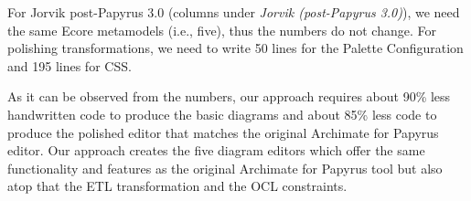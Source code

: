 For Jorvik post-Papyrus 3.0 (columns under \textit{Jorvik (post-Papyrus 3.0)}), we need the same Ecore metamodels (i.e., five), thus the numbers do not change. 
For polishing transformations, we need to write 50 lines for the Palette Configuration and 195 lines for CSS. 

As it can be observed from the numbers, our approach requires about 90\% less handwritten code to produce the basic diagrams and about 85\% less code to 
produce the polished editor that matches the original Archimate for Papyrus editor. 
Our approach creates the five diagram editors which offer the same functionality and features as the original Archimate for Papyrus tool but also atop that the ETL transformation and the OCL constraints.

